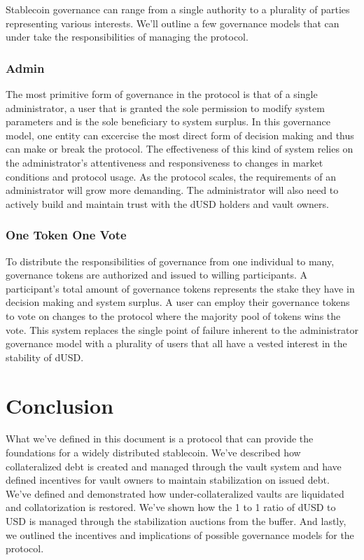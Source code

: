 \documentclass[12pt]{article}
\begin{document}
Stablecoin governance can range from a single authority to a plurality of parties representing various interests. We'll outline a few governance models that can under take the responsibilities of managing the protocol.

\subsubsection{Admin}
The most primitive form of governance in the protocol is that of a single administrator, a user that is granted the sole permission to modify system parameters and is the sole beneficiary to system surplus. In this governance model, one entity can excercise the most direct form of decision making and thus can make or break the protocol. The effectiveness of this kind of system relies on the administrator's attentiveness and responsiveness to changes in market conditions and protocol usage. As the protocol scales, the requirements of an administrator will grow more demanding. The administrator will also need to actively build and maintain trust with the dUSD holders and vault owners.

\subsubsection{One Token One Vote}
To distribute the responsibilities of governance from one individual to many, governance tokens are authorized and issued to willing participants. A participant's total amount of governance tokens represents the stake they have in decision making and system surplus. A user can employ their governance tokens to vote on changes to the protocol where the majority pool of tokens wins the vote. This system replaces the single point of failure inherent to the administrator governance model with a plurality of users that all have a vested interest in the stability of dUSD.

\section{Conclusion}
What we've defined in this document is a protocol that can provide the foundations for a widely distributed stablecoin. We've described how collateralized debt is created and managed through the vault system and have defined incentives for vault owners to maintain stabilization on issued debt. We've defined and demonstrated how under-collateralized vaults are liquidated and collatorization is restored. We've shown how the 1 to 1 ratio of dUSD to USD is managed through the stabilization auctions from the buffer. And lastly, we outlined the incentives and implications of possible governance models for the protocol.
\end{document}
